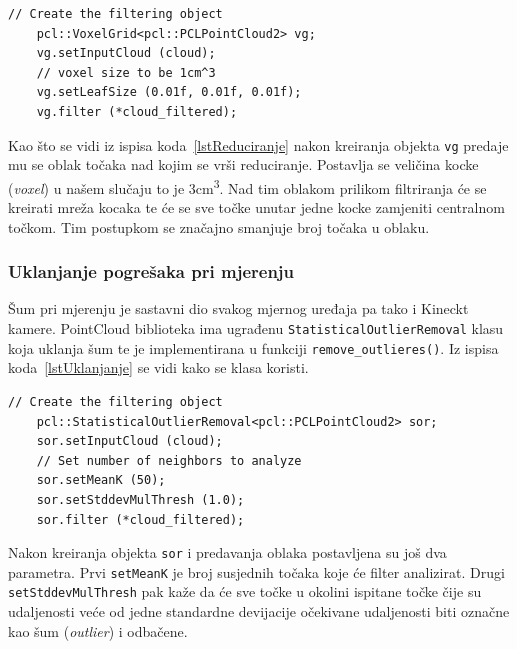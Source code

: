 \begin{lstlisting}[label=lstReduciranje, caption={Dio izvornog koda za
reduciranje točaka iz funkcije \texttt{downsample()} }]
    // Create the filtering object
    pcl::VoxelGrid<pcl::PCLPointCloud2> vg;
    vg.setInputCloud (cloud);
    // voxel size to be 1cm^3
    vg.setLeafSize (0.01f, 0.01f, 0.01f);
    vg.filter (*cloud_filtered);
\end{lstlisting}

Kao što se vidi iz ispisa koda~\ref{lstReduciranje} nakon kreiranja
objekta \texttt{vg} predaje mu se oblak točaka nad kojim se vrši
reduciranje. Postavlja se veličina kocke (\textit{voxel}) u našem
slučaju to je 3cm\textsuperscript{3}. Nad tim oblakom prilikom
filtriranja će se kreirati mreža kocaka te će se sve točke unutar jedne
kocke zamjeniti centralnom točkom. Tim postupkom se značajno smanjuje
broj točaka u oblaku.


\subsubsection{Uklanjanje pogrešaka pri mjerenju} %
\label{ssub:Uklanjanje pogrešaka pri mjerenju}
Šum pri mjerenju je sastavni dio svakog mjernog uređaja pa tako i
Kineckt kamere. PointCloud biblioteka ima ugrađenu
\texttt{StatisticalOutlierRemoval} klasu koja uklanja šum te je
implementirana u funkciji \texttt{remove\_outlieres()}.
Iz ispisa koda~\ref{lstUklanjanje} se vidi kako se klasa koristi.

\begin{minipage}{\textwidth}
\begin{lstlisting}[label=lstUklanjanje, caption={Dio izvornog koda 
iz funkcije \texttt{remove\_outliers()} }]
    // Create the filtering object
    pcl::StatisticalOutlierRemoval<pcl::PCLPointCloud2> sor;
    sor.setInputCloud (cloud);
    // Set number of neighbors to analyze
    sor.setMeanK (50);
    sor.setStddevMulThresh (1.0);
    sor.filter (*cloud_filtered);
\end{lstlisting}
\end{minipage}

Nakon kreiranja objekta \texttt{sor} i predavanja oblaka postavljena su
još dva parametra. Prvi \texttt{setMeanK} je broj susjednih točaka koje
će filter analizirat. Drugi \texttt{setStddevMulThresh} pak kaže da će
sve točke u okolini ispitane točke čije su udaljenosti veće od jedne
standardne devijacije očekivane udaljenosti biti označne kao šum
(\textit{outlier}) i odbačene.

